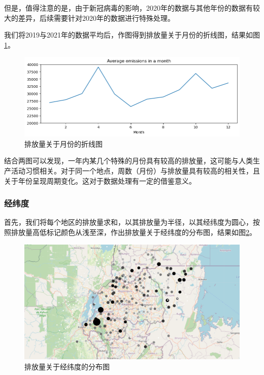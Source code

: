 \documentclass{ctexart}
\begin{document}
但是，值得注意的是，由于新冠病毒的影响，2020年的数据与其他年份的数据有较大的差异，后续需要针对2020年的数据进行特殊处理。

我们将2019与2021年的数据平均后，作图得到排放量关于月份的折线图，结果如图\ref{fig:3}。

\begin{figure}[H]
      \centering
      \includegraphics[width=1\textwidth]{output3.png}
      \caption{\label{fig:3}排放量关于月份的折线图}
\end{figure}

结合两图可以发现，一年内某几个特殊的月份具有较高的排放量，这可能与人类生产活动习惯相关。对于同一个地点，周数（月份）与排放量具有较高的相关性，且关于年份呈现周期变化。这对于数据处理有一定的借鉴意义。

\subsubsection{经纬度}

首先，我们将每个地区的排放量求和，以其排放量为半径，以其经纬度为圆心，按照排放量高低标记颜色从浅至深，作出排放量关于经纬度的分布图，结果如图\ref{fig:9}。

\begin{figure}[H]
      \centering
      \includegraphics[width=1\textwidth]{output9.png}
      \caption{\label{fig:9}排放量关于经纬度的分布图}
\end{figure}
\end{document}
